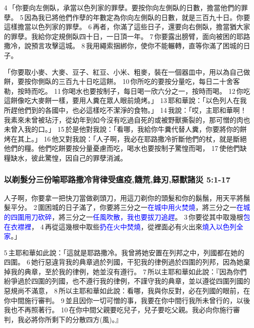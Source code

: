 4 「你要向左側臥，承當以色列家的罪孽。要按你向左側臥的日數，擔當他們的罪孽。 5 因為我已將他們作孽的年數定為你向左側臥的日數，就是三百九十日。你要這樣擔當以色列家的罪孽。 6 再者，你滿了這些日子，還要向右側臥，擔當猶大家的罪孽。我給你定規側臥四十日，一日頂一年。 7 你要露出膀臂，面向被困的耶路撒冷，說預言攻擊這城。 8 我用繩索捆綁你，使你不能輾轉，直等你滿了困城的日子。

「你要取小麥、大麥、豆子、紅豆、小米、粗麥，裝在一個器皿中，用以為自己做餅，要按你側臥的三百九十日吃這餅。 10 你所吃的要按分量吃，每日二十舍客勒，按時而吃。 11 你喝水也要按制子，每日喝一欣六分之一，按時而喝。 12 你吃這餅像吃大麥餅一樣，要用人糞在眾人眼前燒烤。」 13 耶和華說：「以色列人在我所趕他們到的各國中，也必這樣吃不潔淨的食物。」 14 我說：「哎，主耶和華啊！我素來未曾被玷汙，從幼年到如今沒有吃過自死的或被野獸撕裂的，那可憎的肉也未曾入我的口。」 15 於是他對我說：「看哪，我給你牛糞代替人糞，你要將你的餅烤在其上。」 16 他又對我說：「人子啊，我必在耶路撒冷折斷他們的杖，就是斷絕他們的糧。他們吃餅要按分量憂慮而吃，喝水也要按制子驚惶而喝， 17 使他們缺糧缺水，彼此驚惶，因自己的罪孽消滅。

\subsubsection{以剃髮分三份喻耶路撒冷背律受瘟疫,饑荒,鋒刃,惡獸諸災 5:1-17}
人子啊，你要拿一把快刀當做剃頭刀，用這刀剃你的頭髮和你的鬍鬚，用天平將鬚髮平分。 2 圍困城的日子滿了，你要將三分之一\textcolor{blue}{在城中用火焚燒}，將三分之一\textcolor{blue}{在城的四圍用刀砍碎}，將三分之一\textcolor{blue}{任風吹散，我也要拔刀追趕}。 3 你要從其中取幾根\textcolor{blue}{包在衣襟裡}， 4 再從這幾根中取些\textcolor{blue}{扔在火中焚燒}，從裡面必有火出來\textcolor{blue}{燒入以色列全家}。」

5 主耶和華如此說：「這就是耶路撒冷。我曾將她安置在列邦之中，列國都在她的四圍。 6 她行惡違背我的典章過於列國，干犯我的律例過於四圍的列邦，因為她棄掉我的典章，至於我的律例，她並沒有遵行。 7 所以主耶和華如此說：『因為你們紛爭過於四圍的列國，也不遵行我的律例，不謹守我的典章，並以遵從四圍列國的惡規尚不滿意， 8 所以主耶和華如此說：看哪，我與你反對，必在列國的眼前，在你中間施行審判。 9 並且因你一切可憎的事，我要在你中間行我所未曾行的，以後我也不再照著行。 10 在你中間父親要吃兒子，兒子要吃父親。我必向你施行審判，我必將你所剩下的分散四方(風)。』

